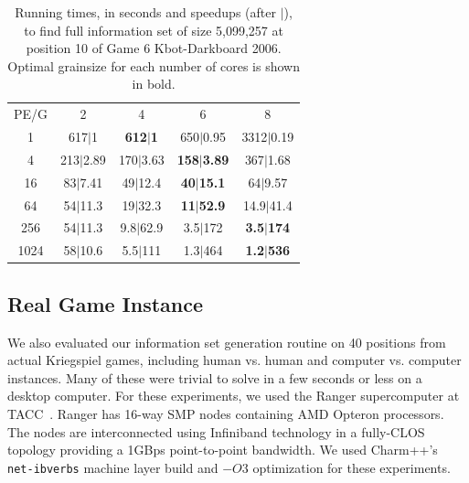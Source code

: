 \documentclass[10pt, conference, compsocconf]{IEEEtran}
\begin{document}
\begin{table}[th]
\caption{Running times, in seconds and speedups (after $|$), to find full
information set of size 5,099,257 at position 10 of Game 6 Kbot-Darkboard 2006.
Optimal grainsize for each number of cores is shown in bold.}
\centering
\begin{tabular}{ccccc}
PE/G & 2 & 4 & 6 & 8 \\
1 & 617$|$1 & {\bf 612$|$1} & 650$|$0.95 & 3312$|$0.19 \\
4 & 213$|$2.89 & 170$|$3.63 & {\bf 158$|$3.89} & 367$|$1.68 \\
16 & 83$|$7.41 & 49$|$12.4 & {\bf 40$|$15.1} & 64$|$9.57 \\
64 & 54$|$11.3 & 19$|$32.3 & {\bf 11$|$52.9} & 14.9$|$41.4 \\
256 & 54$|$11.3 & 9.8$|$62.9 & 3.5$|$172 & {\bf 3.5$|$174} \\
1024 & 58$|$10.6 & 5.5$|$111 & 1.3$|$464 & {\bf 1.2$|$536} \\
\end{tabular}

\label{tab:prob5}
\vspace{-0.2in}
\end{table}

\subsection{Real Game Instance}
%
%
%
%
%

We also evaluated our information set generation routine on 40 positions from
actual Kriegspiel games, including human vs. human and computer vs. computer
instances.  Many of these were trivial to solve in a few seconds or less on a
desktop computer.  For these experiments, we used the Ranger supercomputer
at TACC~\cite{ranger}. Ranger has 16-way SMP nodes containing AMD Opteron
processors. The nodes are interconnected using Infiniband technology in a
fully-CLOS topology providing a 1GBps point-to-point bandwidth. We used {\sc Charm++}'s \texttt{net-ibverbs} machine layer build and $-O3$ optimization for these experiments.
\end{document}
